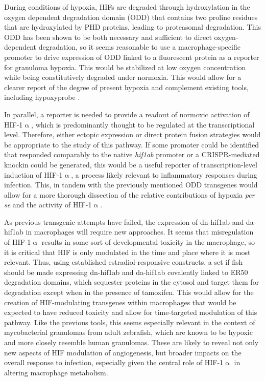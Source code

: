 During conditions of hypoxia, HIFs are degraded through hydroxylation in the oxygen dependent degradation domain (ODD) that contains two proline residues that are hydroxylated by PHD proteins, leading to proteasomal degradation. This ODD has been shown to be both necessary and sufficient to direct oxygen-dependent degradation, so it seems reasonable to use a macrophage-specific promoter to drive expression of ODD linked to a fluorescent protein as a reporter for granuloma hypoxia. This would be stabilized at low oxygen concentration while being constitutively degraded under normoxia. This would allow for a clearer report of the degree of present hypoxia and complement existing tools, including hypoxyprobe \citep{Cousins2016, Huang1998}.

In parallel, a reporter is needed to provide a readout of normoxic activation of HIF-1$\upalpha$, which is predominantly thought to be regulated at the transcriptional level. Therefore, either ectopic expression or direct protein fusion strategies would be appropriate to the study of this pathway. If some promoter could be identified that responded comparably to the native \textit{hif1ab} promoter or a CRISPR-mediated knockin could be generated, this would be a useful reporter of transcription-level induction of HIF-1$\upalpha$, a process likely relevant to inflammatory responses during infection.  This, in tandem with the previously mentioned ODD transgenes would allow for a more thorough dissection of the relative contributions of hypoxia \textit{per se} and the activity of HIF-1$\upalpha$.

As previous transgenic attempts have failed, the expression of dn-hif1ab and da-hif1ab in macrophages will require new approaches. It seems that misregulation of HIF-1$\upalpha$ results in some sort of developmental toxicity in the macrophage, so it is critical that HIF is only modulated in the time and place where it is most relevant. Thus, using established estradiol-responsive constructs, a set if fish should be made expressing dn-hif1ab and da-hif1ab covalently linked to ER50 degradation domains, which sequester proteins in the cytosol and target them for degradation except when in the presence of tamoxifen. This would allow for the creation of HIF-modulating transgenes within macrophages that would be expected to have reduced toxicity and allow for time-targeted modulation of this pathway. Like the previous tools, this seems especially relevant in the context of mycobacterial granulomas from adult zebrafish, which are known to be hypoxic and more closely resemble human granulomas. These are likely to reveal not only new aspects of HIF modulation of angiogenesis, but broader impacts on the overall response to infection, especially given the central role of HIF-1$\upalpha$ in altering macrophage metabolism.

